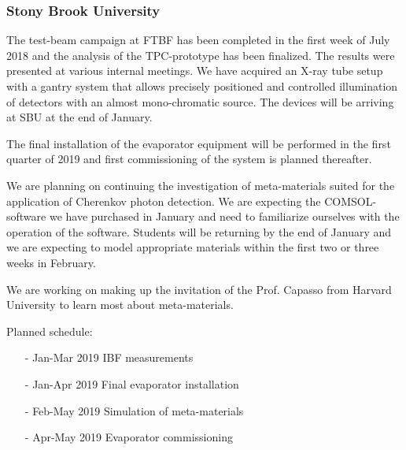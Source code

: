 \subsubsection{Stony Brook University} 
The test-beam campaign at FTBF has been completed in the first week of July 2018 and the analysis of the TPC-prototype has been finalized. The results were presented at various internal meetings.\newline
We have acquired an X-ray tube setup with a gantry system that allows precisely positioned and controlled illumination of detectors with an almost mono-chromatic source. The devices will be arriving at SBU at the end of January.

The final installation of the evaporator equipment will be performed in the first quarter of 2019 and first commissioning of the system is planned thereafter.

We are planning on continuing the investigation of meta-materials suited for the application of Cherenkov photon detection. We are expecting the COMSOL-software we have purchased in January and need to familiarize ourselves with the operation of the software. Students will be returning by the end of January and we are expecting to model appropriate materials within the first two or three weeks in February.

We are working on making up the invitation of the Prof. Capasso from Harvard University to learn most about meta-materials.

Planned schedule:
\begin{itemize}
\item[-] Jan-Mar 2019 IBF measurements
\item[-] Jan-Apr 2019 Final evaporator installation
\item[-] Feb-May 2019 Simulation of meta-materials
\item[-] Apr-May 2019 Evaporator commissioning
\end{itemize}